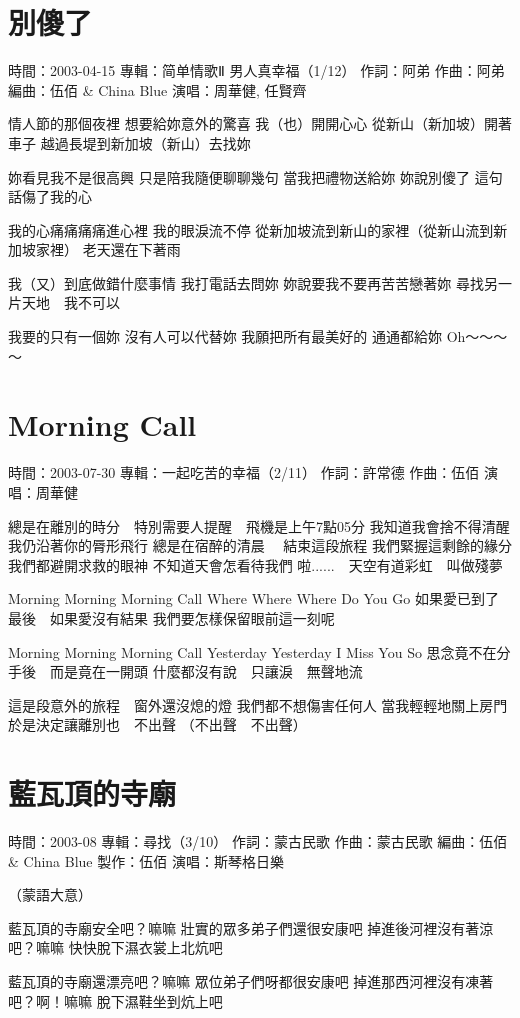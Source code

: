 \documentclass[UTF8,a4paper,oneside,twocolumn,12pt]{ctexbook}
\newcommand{\infopair}[2]{\textbullet #1：#2}
\newcommand{\zc}[1][伍佰]{\infopair{作詞}{#1}}
\newcommand{\zq}[1][伍佰]{\infopair{作曲}{#1}}
\newcommand{\bq}[1][伍佰]{\infopair{編曲}{#1}}
\newcommand{\zj}[1]{\infopair{專輯}{#1}}
\newcommand{\zz}[1]{\infopair{製作}{#1}}
\newcommand{\sj}[1]{\infopair{時間}{#1}}
\newenvironment{info}{\begin{flushleft}\kaishu
	}
	{\end{flushleft}\normalsize\yahei\par}
\newenvironment{lyric}{
	}
{}
\begin{document}
\section{別傻了}
\begin{info}
	\sj{2003-04-15}
	\zj{简单情歌Ⅱ 男人真幸福（1/12）}
	\zc[阿弟]
	\zq[阿弟]
	\bq[伍佰 \& China Blue]
	\infopair{演唱}{周華健, 任賢齊}
\end{info}
\begin{lyric}
	情人節的那個夜裡
	想要給妳意外的驚喜
	我（也）開開心心 從新山（新加坡）開著車子
	越過長堤到新加坡（新山）去找妳

	妳看見我不是很高興
	只是陪我隨便聊聊幾句
	當我把禮物送給妳
	妳說別傻了
	這句話傷了我的心

	我的心痛痛痛痛進心裡
	我的眼淚流不停
	從新加坡流到新山的家裡（從新山流到新加坡家裡）
	老天還在下著雨

	我（又）到底做錯什麼事情
	我打電話去問妳
	妳說要我不要再苦苦戀著妳
	尋找另一片天地　我不可以

	我要的只有一個妳 沒有人可以代替妳
	我願把所有最美好的 通通都給妳
	Oh～～～～
\end{lyric}

\section{Morning Call}
\begin{info}
	\sj{2003-07-30}
	\zj{一起吃苦的幸福（2/11）}
	\zc[許常德]
	\zq
	\infopair{演唱}{周華健}
\end{info}
\begin{lyric}
	總是在離別的時分　特別需要人提醒　飛機是上午7點05分
	我知道我會捨不得清醒　我仍沿著你的脣形飛行
	總是在宿醉的清晨 　結束這段旅程
	我們緊握這剩餘的緣分　我們都避開求救的眼神
	不知道天會怎看待我們
	啦......　天空有道彩虹　叫做殘夢

	Morning Morning Morning Call
	Where Where Where Do You Go
	如果愛已到了最後　如果愛沒有結果
	我們要怎樣保留眼前這一刻呢

	Morning Morning Morning Call
	Yesterday Yesterday I Miss You So
	思念竟不在分手後　而是竟在一開頭
	什麼都沒有說　只讓淚　無聲地流

	這是段意外的旅程　窗外還沒熄的燈
	我們都不想傷害任何人
	當我輕輕地關上房門　於是決定讓離別也　不出聲
	（不出聲　不出聲）
\end{lyric}

\section{藍瓦頂的寺廟}
\begin{info}
	\sj{2003-08}
	\zj{尋找（3/10）}
	\zc[蒙古民歌]
	\zq[蒙古民歌]
	\bq[伍佰 \& China Blue]
	\zz{伍佰}
	\infopair{演唱}{斯琴格日樂}
\end{info}
\begin{lyric}
	（蒙語大意）

	藍瓦頂的寺廟安全吧？嘛嘛
	壯實的眾多弟子們還很安康吧
	掉進後河裡沒有著涼吧？嘛嘛
	快快脫下濕衣裳上北炕吧

	藍瓦頂的寺廟還漂亮吧？嘛嘛
	眾位弟子們呀都很安康吧
	掉進那西河裡沒有凍著吧？啊！嘛嘛
	脫下濕鞋坐到炕上吧
\end{lyric}
\end{document}
